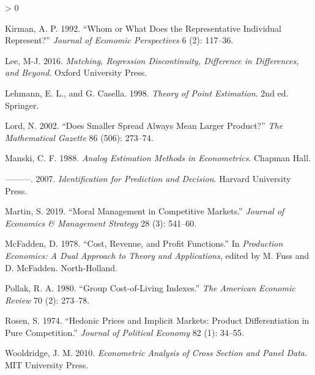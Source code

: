 \documentclass[
]{article}
\newlength{\cslhangindent}
\newenvironment{CSLReferences}[2] %
 {%
  \setlength{\parindent}{0pt}
  \ifodd #1 \everypar{\setlength{\hangindent}{\cslhangindent}}\ignorespaces\fi
  \ifnum #2 > 0
  \setlength{\parskip}{#2\baselineskip}
  \fi
 }%
 {}
\begin{document}
\begin{CSLReferences}{1}{0}
\leavevmode\hypertarget{ref-kirman1992}{}%
Kirman, A. P. 1992. {``Whom or What Does the Representative Individual Represent?''} \emph{Journal of Economic Perspectives} 6 (2): 117--36.

\leavevmode\hypertarget{ref-lee2016}{}%
Lee, M-J. 2016. \emph{Matching, Regression Discontinuity, Difference in Differences, and Beyond}. Oxford University Press.

\leavevmode\hypertarget{ref-lehmann1998}{}%
Lehmann, E. L., and G. Casella. 1998. \emph{Theory of Point Estimation}. 2nd ed. Springer.

\leavevmode\hypertarget{ref-lord2002}{}%
Lord, N. 2002. {``Does Smaller Spread Always Mean Larger Product?''} \emph{The Mathematical Gazette} 86 (506): 273--74.

\leavevmode\hypertarget{ref-manski1988}{}%
Manski, C. F. 1988. \emph{Analog Estimation Methods in Econometrics}. Chapman Hall.

\leavevmode\hypertarget{ref-manski2007}{}%
---------. 2007. \emph{Identification for Prediction and Decision}. Harvard University Press.

\leavevmode\hypertarget{ref-martin2019}{}%
Martin, S. 2019. {``Moral Management in Competitive Markets.''} \emph{Journal of Economics \& Management Strategy} 28 (3): 541--60.

\leavevmode\hypertarget{ref-mcfadden1978}{}%
McFadden, D. 1978. {``Cost, Revenue, and Profit Functions.''} In \emph{Production Economics: A Dual Approach to Theory and Applications}, edited by M. Fuss and D. McFadden. North-Holland.

\leavevmode\hypertarget{ref-pollak1980}{}%
Pollak, R. A. 1980. {``Group Cost-of-Living Indexes.''} \emph{The American Economic Review} 70 (2): 273--78.

\leavevmode\hypertarget{ref-rosen1974}{}%
Rosen, S. 1974. {``Hedonic Prices and Implicit Markets: Product Differentiation in Pure Competition.''} \emph{Journal of Political Economy} 82 (1): 34--55.

\leavevmode\hypertarget{ref-wooldridge2010}{}%
Wooldridge, J. M. 2010. \emph{Econometric Analysis of Cross Section and Panel Data}. MIT University Press.

\end{CSLReferences}
\end{document}
